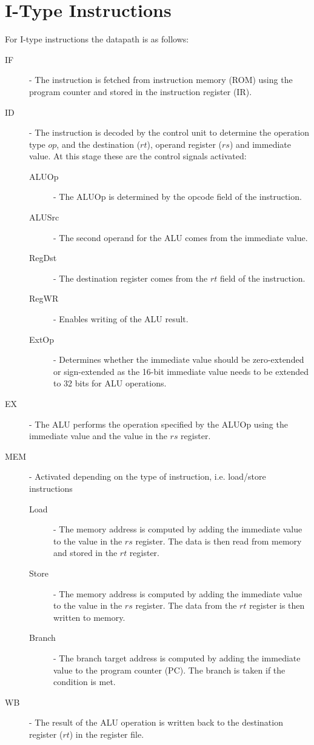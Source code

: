 \documentclass[12pt letter]{report}
\begin{document}
\section{I-Type Instructions}
For I-type instructions the datapath is as follows:
\begin{description}
  \item[IF]  - The instruction is fetched from instruction memory (ROM) using the program counter and stored in the instruction register (IR).
  \item[ID] - The instruction is decoded by the control unit to determine the operation type $op$, and the destination ($rt$), operand register ($rs$) and immediate value. At this stage these are the control signals activated:
        \begin{description}
          \item[ALUOp] - The ALUOp is determined by the opcode field of the instruction.
          \item[ALUSrc] - The second operand for the ALU comes from the immediate value.
          \item[RegDst] - The destination register comes from the $rt$ field of the instruction.
          \item[RegWR] - Enables writing of the ALU result.
          \item[ExtOp] - Determines whether the immediate value should be zero-extended or sign-extended as the 16-bit immediate value needs to be extended to 32 bits for ALU operations.
        \end{description}
  \item[EX] - The ALU performs the operation specified by the ALUOp using the immediate value and the value in the $rs$ register.
  \item[MEM] - Activated depending on the type of instruction, i.e. load/store instructions
        \begin{description}
          \item[Load] - The memory address is computed by adding the immediate value to the value in the $rs$ register. The data is then read from memory and stored in the $rt$ register.
          \item[Store] - The memory address is computed by adding the immediate value to the value in the $rs$ register. The data from the $rt$ register is then written to memory.
          \item[Branch] - The branch target address is computed by adding the immediate value to the program counter (PC). The branch is taken if the condition is met.
        \end{description}
  \item[WB] - The result of the ALU operation is written back to the destination register ($rt$) in the register file.
\end{description}
\end{document}
